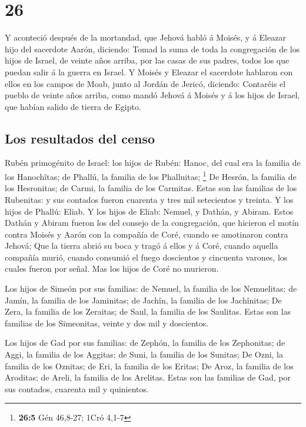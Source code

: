 \hypertarget{section-25}{%
\section{26}\label{section-25}}

 Y aconteció después de la mortandad, que Jehová habló á
Moisés, y á Eleazar hijo del sacerdote Aarón, diciendo: 
Tomad la suma de toda la congregación de los hijos de Israel, de veinte
años arriba, por las casas de sus padres, todos los que puedan salir á
la guerra en Israel.  Y Moisés y Eleazar el sacerdote
hablaron con ellos en los campos de Moab, junto al Jordán de Jericó,
diciendo:  Contaréis el pueblo de veinte años arriba, como
mandó Jehová á Moisés y á los hijos de Israel, que habían salido de
tierra de Egipto.

\hypertarget{los-resultados-del-censo-1}{%
\subsection{Los resultados del censo}\label{los-resultados-del-censo-1}}

 Rubén primogénito de Israel: los hijos de Rubén: Hanoc,
del cual era la familia de los Hanochîtas; de Phallú, la familia de los
Phalluitas; \footnote{\textbf{26:5} Gén 46,8-27; 1Cró 4,1-7}
 De Hesrón, la familia de los Hesronitas; de Carmi, la
familia de los Carmitas.  Estas son las familias de los
Rubenitas: y sus contados fueron cuarenta y tres mil setecientos y
treinta.  Y los hijos de Phallú: Eliab.  Y
los hijos de Eliab: Nemuel, y Dathán, y Abiram. Estos Dathán y Abiram
fueron los del consejo de la congregación, que hicieron el motín contra
Moisés y Aarón con la compañía de Coré, cuando se amotinaron contra
Jehová;  Que la tierra abrió su boca y tragó á ellos y á
Coré, cuando aquella compañía murió, cuando consumió el fuego doscientos
y cincuenta varones, los cuales fueron por señal.  Mas
los hijos de Coré no murieron.

 Los hijos de Simeón por sus familias: de Nemuel, la
familia de los Nemuelitas; de Jamín, la familia de los Jaminitas; de
Jachîn, la familia de los Jachînitas;  De Zera, la
familia de los Zeraitas; de Saul, la familia de los Saulitas.
 Estas son las familias de los Simeonitas, veinte y dos
mil y doscientos.

 Los hijos de Gad por sus familias: de Zephón, la familia
de los Zephonitas; de Aggi, la familia de los Aggitas; de Suni, la
familia de los Sunitas;  De Ozni, la familia de los
Oznitas; de Eri, la familia de los Eritas;  De Aroz, la
familia de los Aroditas; de Areli, la familia de los Arelitas.
 Estas son las familias de Gad, por sus contados,
cuarenta mil y quinientos.

